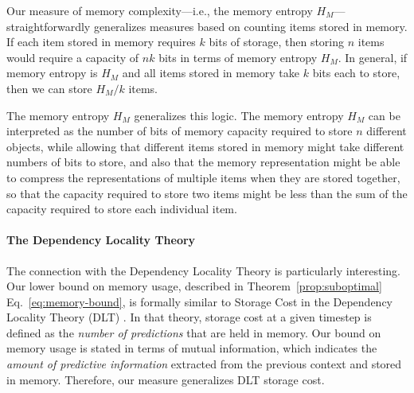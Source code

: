 
Our measure of memory complexity---i.e., the memory entropy $H_M$---straightforwardly generalizes measures based on counting items stored in memory. If each item stored in memory requires $k$ bits of storage, then storing $n$ items would require a capacity of $nk$ bits in terms of memory entropy $H_M$. In general, if memory entropy is $H_M$ and all items stored in memory take $k$ bits each to store, then we can store $H_M/k$ items. 

The memory entropy $H_M$ generalizes this logic. The memory entropy $H_M$ can be interpreted as the number of bits of memory capacity required to store $n$ different objects, while allowing that different items stored in memory might take different numbers of bits to store, and also that the memory representation might be able to compress the representations of multiple items when they are stored together, so that the capacity required to store two items might be less than the sum of the capacity required to store each individual item. 

\paragraph{The Dependency Locality Theory}
The connection with the Dependency Locality Theory is particularly interesting.
Our lower bound on memory usage, described in Theorem~\ref{prop:suboptimal} Eq.~\ref{eq:memory-bound}, is formally similar to Storage Cost in the Dependency Locality Theory (DLT) \citep{gibson-linguistic-1998,gibson2000dependency}.
In that theory, storage cost at a given timestep is defined as the \emph{number of predictions} that are held in memory.
Our bound on memory usage is stated in terms of mutual information, which indicates the \emph{amount of predictive information} extracted from the previous context and stored in memory.
Therefore, our measure generalizes DLT storage cost.


